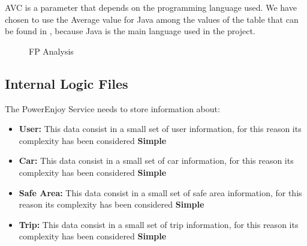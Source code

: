 AVC is a parameter that depends on the programming language used. We have chosen to use the Average value for Java among the values of the table that can be found in \cite{AVCTable}, because Java is the main language used in the project. 

\begin{figure}[h]
	\centering
	\caption{FP Analysis}
\end{figure}
\FloatBarrier


\subsection{Internal Logic Files} %

The PowerEnjoy Service needs to store information about:

\begin{itemize}
	\item \textbf{User:} This data consist in a small set of user information, for this reason its complexity has been considered \textbf{Simple}
	\item \textbf{Car:} This data consist in a small set of car information, for this reason its complexity has been considered \textbf{Simple}
	\item \textbf{Safe Area:} This data consist in a small set of safe area information, for this reason its complexity has been considered \textbf{Simple}
	\item \textbf{Trip:} This data consist in a small set of trip information, for this reason its complexity has been considered \textbf{Simple}
\end{itemize}

